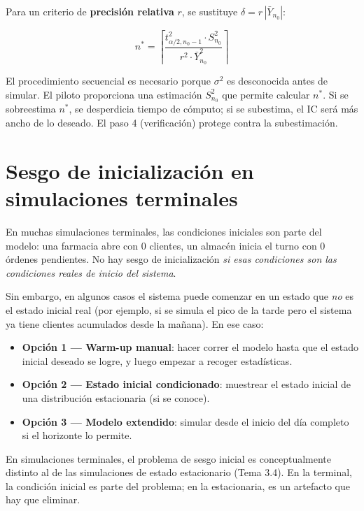 \documentclass[11pt, letterpaper]{article}
\begin{document}
Para un criterio de \textbf{precisión relativa} $r$, se sustituye $\delta = r\,|\bar Y_{n_0}|$:

\[
n^* = \left\lceil\frac{t_{\alpha/2,n_0-1}^2 \cdot S_{n_0}^2}{r^2 \cdot \bar Y_{n_0}^2}\right\rceil
\]

\begin{notabox}
El procedimiento secuencial es necesario porque $\sigma^2$ es desconocida antes de simular. El piloto proporciona una estimación $S_{n_0}^2$ que permite calcular $n^*$. Si se sobreestima $n^*$, se desperdicia tiempo de cómputo; si se subestima, el IC será más ancho de lo deseado. El paso 4 (verificación) protege contra la subestimación.
\end{notabox}

\section{Sesgo de inicialización en simulaciones terminales}

En muchas simulaciones terminales, las condiciones iniciales son parte del modelo: una farmacia abre con 0 clientes, un almacén inicia el turno con 0 órdenes pendientes. No hay sesgo de inicialización \emph{si esas condiciones son las condiciones reales de inicio del sistema}.

Sin embargo, en algunos casos el sistema puede comenzar en un estado que \emph{no} es el estado inicial real (por ejemplo, si se simula el pico de la tarde pero el sistema ya tiene clientes acumulados desde la mañana). En ese caso:

\begin{itemize}
    \item \textbf{Opción 1 — Warm-up manual}: hacer correr el modelo hasta que el estado inicial deseado se logre, y luego empezar a recoger estadísticas.
    \item \textbf{Opción 2 — Estado inicial condicionado}: muestrear el estado inicial de una distribución estacionaria (si se conoce).
    \item \textbf{Opción 3 — Modelo extendido}: simular desde el inicio del día completo si el horizonte lo permite.
\end{itemize}

\begin{notabox}
En simulaciones terminales, el problema de sesgo inicial es conceptualmente distinto al de las simulaciones de estado estacionario (Tema 3.4). En la terminal, la condición inicial es parte del problema; en la estacionaria, es un artefacto que hay que eliminar.
\end{notabox}
\end{document}
